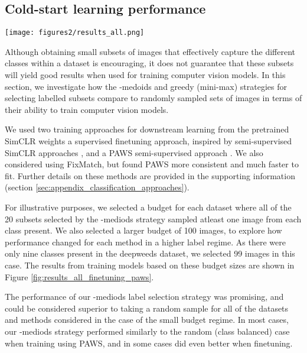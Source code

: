 \documentclass{article}
\begin{document}
\subsection{Cold-start learning performance}
\label{sec:cold_start_learning_performance}

\begin{figure*}[tp]
\centering
\texttt{[image: figures2/results\_all.png]}
\caption{Performance of finetuning and semi-supervised (PAWS) approaches using small numbers of labelled images, selected using different strategies. The dotted lines represent our fully supervised baselines for each dataset.}
\label{fig:results_all_finetuning_paws}
\end{figure*}

Although obtaining small subsets of images that effectively capture the different classes within a dataset is encouraging, it does not guarantee that these subsets will yield good results when used for training computer vision models. In this section, we investigate how the -medoids and greedy (mini-max) strategies for selecting labelled subsets compare to randomly sampled sets of images in terms of their ability to train computer vision models.

We used two training approaches for downstream learning from the pretrained SimCLR weights \textemdash{} a supervised finetuning approach, inspired by semi-supervised SimCLR approaches \citep{chen2020big, chen2020simple}, and a PAWS semi-supervised approach \citep{assran2021semi}. We also considered using FixMatch, but found PAWS more consistent and much faster to fit. Further details on these methods are provided in the supporting information (section \ref{sec:appendix_classification_approaches}).

For illustrative purposes, we selected a budget for each dataset where all of the 20 subsets selected by the -mediods strategy sampled atleast one image from each class present. We also selected a larger budget of 100 images, to explore how performance changed for each method in a higher label regime. As there were only nine classes present in the deepweeds dataset, we selected 99 images in this case. The results from training models based on these budget sizes are shown in Figure \ref{fig:results_all_finetuning_paws}. 

The performance of our -mediods label selection strategy was promising, and could be considered superior to taking a random sample for all of the datasets and methods considered in the case of the small budget regime. In most cases, our -mediods strategy performed similarly to the random (class balanced) case when training using PAWS, and in some cases did even better when finetuning.
\end{document}
